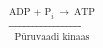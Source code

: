 \documentclass[preview]{standalone}
\begin{document}
\begin{align*}
\xrightarrow[\text{Püruvaadi kinaas}]{\text{ADP + P}_i \:\rightarrow\: \text{ATP}}
\end{align*}
\end{document}

